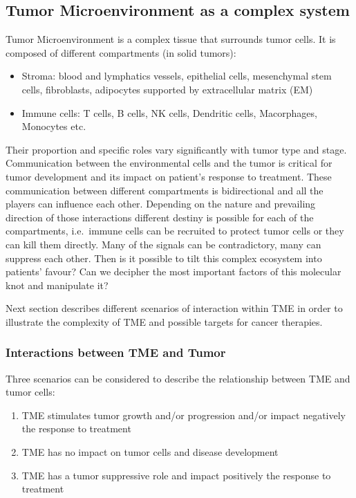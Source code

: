\documentclass[12pt,]{book}
\providecommand{\tightlist}{%
  \setlength{\itemsep}{0pt}\setlength{\parskip}{0pt}}
\theoremstyle{definition}
\theoremstyle{definition}
\theoremstyle{definition}
\theoremstyle{remark}
\begin{document}
\hypertarget{tumor-microenvironment-as-a-complex-system}{%
\subsection{Tumor Microenvironment as a complex
system}\label{tumor-microenvironment-as-a-complex-system}}

Tumor Microenvironment is a complex tissue that surrounds tumor cells.
It is composed of different compartments (in solid tumors):

\begin{itemize}
\tightlist
\item
  Stroma: blood and lymphatics vessels, epithelial cells, mesenchymal
  stem cells, fibroblasts, adipocytes supported by extracellular matrix
  (EM)
\item
  Immune cells: T cells, B cells, NK cells, Dendritic cells,
  Macorphages, Monocytes etc.
\end{itemize}

Their proportion and specific roles vary significantly with tumor type
and stage. Communication between the environmental cells and the tumor
is critical for tumor development and its impact on patient's response
to treatment. These communication between different compartments is
bidirectional and all the players can influence each other. Depending on
the nature and prevailing direction of those interactions different
destiny is possible for each of the compartments, i.e.~immune cells can
be recruited to protect tumor cells or they can kill them directly. Many
of the signals can be contradictory, many can suppress each other. Then
is it possible to tilt this complex ecosystem into patients' favour? Can
we decipher the most important factors of this molecular knot and
manipulate it?

Next section describes different scenarios of interaction within TME in
order to illustrate the complexity of TME and possible targets for
cancer therapies.

\hypertarget{interactions-between-tme-and-tumor}{%
\subsubsection{Interactions between TME and
Tumor}\label{interactions-between-tme-and-tumor}}

Three scenarios can be considered to describe the relationship between
TME and tumor cells:

\begin{enumerate}
\def\labelenumi{\arabic{enumi}.}
\tightlist
\item
  TME stimulates tumor growth and/or progression and/or impact
  negatively the response to treatment
\item
  TME has no impact on tumor cells and disease development
\item
  TME has a tumor suppressive role and impact positively the response to
  treatment
\end{enumerate}
\end{document}
